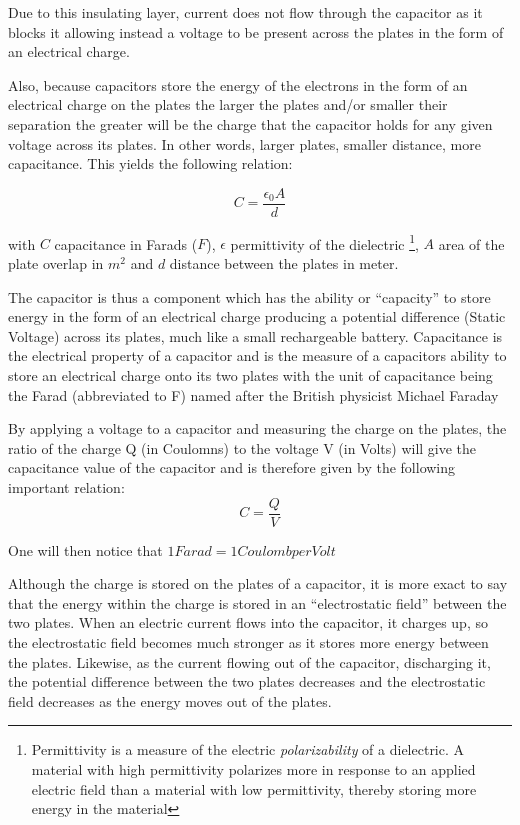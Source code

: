 Due to this insulating layer, current does not flow through the capacitor as it blocks it allowing instead a voltage to be present across the plates in the form of an electrical charge.

Also, because capacitors store the energy of the electrons in the form of an electrical charge on the plates the larger the plates and/or smaller their separation the greater will be the charge that the capacitor holds for any given voltage across its plates. In other words, larger plates, smaller distance, more capacitance. This yields the following relation:

\begin{equation}
    C = \frac{\epsilon_0 A}{d}
\end{equation}

with $C$ capacitance in Farads ($F$), $\epsilon$ permittivity of the dielectric \footnote{Permittivity is a measure of the electric \textit{polarizability} of a dielectric. A material with high permittivity polarizes more in response to an applied electric field than a material with low permittivity, thereby storing more energy in the material}, $A$ area of the plate overlap in $m^2$ and $d$ distance between the plates in meter. 

The capacitor is thus a component which has the ability or “capacity” to store energy in the form of an electrical charge producing a potential difference (Static Voltage) across its plates, much like a small rechargeable battery.
Capacitance is the electrical property of a capacitor and is the measure of a capacitors ability to store an electrical charge onto its two plates with the unit of capacitance being the Farad (abbreviated to F) named after the British physicist Michael Faraday

By applying a voltage to a capacitor and measuring the charge on the plates, the ratio of the charge Q (in Coulomns) to the voltage V (in Volts) will give the capacitance value of the capacitor and is therefore given by the following important relation: 
\begin{equation*}
    C = \frac{Q}{V}
\end{equation*}

One will then notice that $1 Farad = 1 Coulomb per Volt$

Although the charge is stored on the plates of a capacitor, it is more exact to say that the energy within the charge is stored in an “electrostatic field” between the two plates. When an electric current flows into the capacitor, it charges up, so the electrostatic field becomes much stronger as it stores more energy between the plates. Likewise, as the current flowing out of the capacitor, discharging it, the potential difference between the two plates decreases and the electrostatic field decreases as the energy moves out of the plates.

